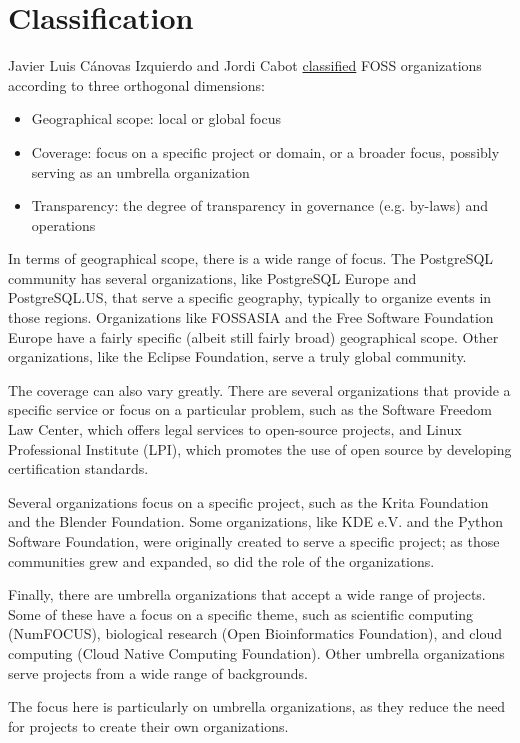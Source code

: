 


\chapter{Classification}

Javier Luis Cánovas Izquierdo and Jordi Cabot \href{https://arxiv.org/pdf/2005.10063.pdf}{classified} FOSS organizations according to three orthogonal dimensions:

\begin{itemize}

\itemsep 0.50em

\item Geographical scope: local or global focus

\item Coverage: focus on a specific project or domain, or a broader focus, possibly serving as an umbrella organization

\item Transparency: the degree of transparency in governance (e.g. by-laws) and operations

\end{itemize}

In terms of geographical scope, there is a wide range of focus.  The PostgreSQL community has several organizations, like PostgreSQL Europe and PostgreSQL.US, that serve a specific geography, typically to organize events in those regions.  Organizations like FOSSASIA and the Free Software Foundation Europe have a fairly specific (albeit still fairly broad) geographical scope.  Other organizations, like the Eclipse Foundation, serve a truly global community.

The coverage can also vary greatly.  There are several organizations that provide a specific service or focus on a particular problem, such as the Software Freedom Law Center, which offers legal services to open-source projects, and Linux Professional Institute (LPI), which promotes the use of open source by developing certification standards.

Several organizations focus on a specific project, such as the Krita Foundation and the Blender Foundation.  Some organizations, like KDE e.V. and the Python Software Foundation, were originally created to serve a specific project; as those communities grew and expanded, so did the role of the organizations.

Finally, there are umbrella organizations that accept a wide range of projects.  Some of these have a focus on a specific theme, such as scientific computing (NumFOCUS), biological research (Open Bioinformatics Foundation), and cloud computing (Cloud Native Computing Foundation).  Other umbrella organizations serve projects from a wide range of backgrounds.

The focus here is particularly on umbrella organizations, as they reduce the need for projects to create their own organizations.

